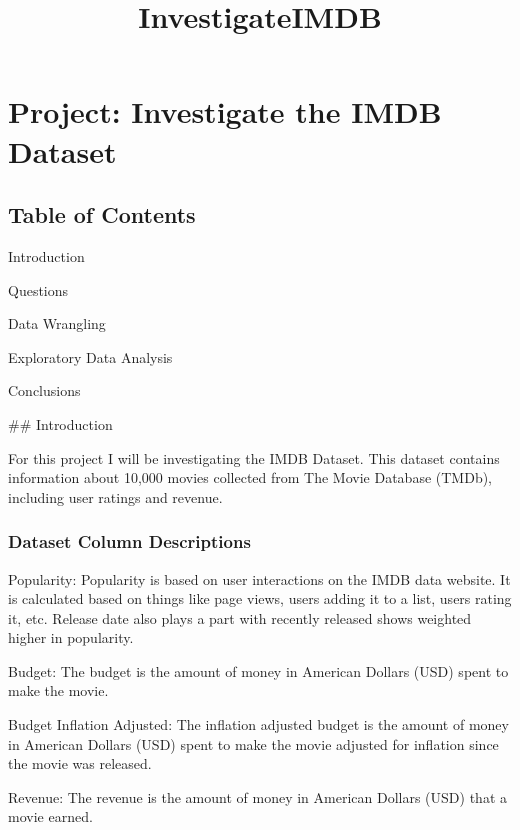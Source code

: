 \documentclass[11pt]{article}
\title{InvestigateIMDB}
\begin{document}
    
    
    \maketitle
    
    

    
    \hypertarget{project-investigate-the-imdb-dataset}{%
\section{Project: Investigate the IMDB
Dataset}\label{project-investigate-the-imdb-dataset}}

\hypertarget{table-of-contents}{%
\subsection{Table of Contents}\label{table-of-contents}}

Introduction

Questions

Data Wrangling

Exploratory Data Analysis

Conclusions

     \#\# Introduction

For this project I will be investigating the IMDB Dataset. This dataset
contains information about 10,000 movies collected from The Movie
Database (TMDb), including user ratings and revenue.

\hypertarget{dataset-column-descriptions}{%
\subsubsection{Dataset Column
Descriptions}\label{dataset-column-descriptions}}

Popularity: Popularity is based on user interactions on the IMDB data
website. It is calculated based on things like page views, users adding
it to a list, users rating it, etc. Release date also plays a part with
recently released shows weighted higher in popularity.

Budget: The budget is the amount of money in American Dollars (USD)
spent to make the movie.

Budget Inflation Adjusted: The inflation adjusted budget is the amount
of money in American Dollars (USD) spent to make the movie adjusted for
inflation since the movie was released.

Revenue: The revenue is the amount of money in American Dollars (USD)
that a movie earned.
\end{document}
